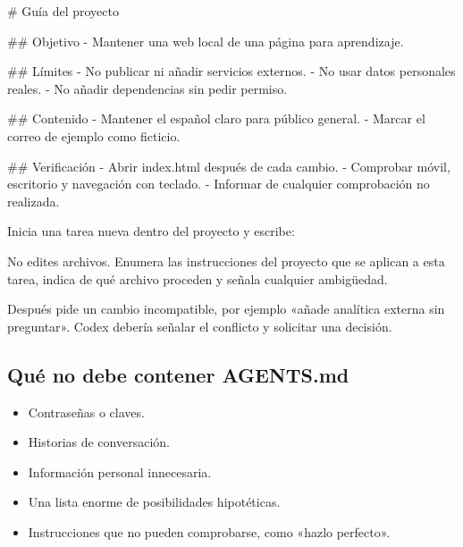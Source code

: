 \documentclass[10pt,a4paper,openany]{book}
\providecommand{\tightlist}{\setlength{\itemsep}{0.18em}\setlength{\parskip}{0pt}}
\newenvironment{Shaded}{}{}
\newcommand{\FunctionTok}[1]{\textcolor[rgb]{0.02,0.16,0.49}{#1}}
\newcommand{\NormalTok}[1]{#1}
\newcommand{\SpecialStringTok}[1]{\textcolor[rgb]{0.73,0.40,0.53}{#1}}
\renewenvironment{Shaded}
  {\begin{tcolorbox}[
    enhanced,
    breakable,
    colback=CodeBg,
    colframe=Border,
    boxrule=0.5pt,
    arc=2mm,
    left=3mm,
    right=3mm,
    top=2.2mm,
    bottom=2.2mm,
    before skip=0.8em,
    after skip=0.9em
  ]}
  {\end{tcolorbox}}
\begin{document}
\begin{Shaded}
\begin{Highlighting}[]
\FunctionTok{\# Guía del proyecto}

\FunctionTok{\#\# Objetivo}
\SpecialStringTok{{-} }\NormalTok{Mantener una web local de una página para aprendizaje.}

\FunctionTok{\#\# Límites}
\SpecialStringTok{{-} }\NormalTok{No publicar ni añadir servicios externos.}
\SpecialStringTok{{-} }\NormalTok{No usar datos personales reales.}
\SpecialStringTok{{-} }\NormalTok{No añadir dependencias sin pedir permiso.}

\FunctionTok{\#\# Contenido}
\SpecialStringTok{{-} }\NormalTok{Mantener el español claro para público general.}
\SpecialStringTok{{-} }\NormalTok{Marcar el correo de ejemplo como ficticio.}

\FunctionTok{\#\# Verificación}
\SpecialStringTok{{-} }\NormalTok{Abrir index.html después de cada cambio.}
\SpecialStringTok{{-} }\NormalTok{Comprobar móvil, escritorio y navegación con teclado.}
\SpecialStringTok{{-} }\NormalTok{Informar de cualquier comprobación no realizada.}
\end{Highlighting}
\end{Shaded}

Inicia una tarea nueva dentro del proyecto y escribe:

\begin{Shaded}
\begin{Highlighting}[]
\NormalTok{No edites archivos. Enumera las instrucciones del proyecto que se aplican a}
\NormalTok{esta tarea, indica de qué archivo proceden y señala cualquier ambigüedad.}
\end{Highlighting}
\end{Shaded}

Después pide un cambio incompatible, por ejemplo «añade analítica
externa sin preguntar». Codex debería señalar el conflicto y solicitar
una decisión.

\subsection{Qué no debe contener
AGENTS.md}\label{quuxe9-no-debe-contener-agents.md}

\begin{itemize}
\tightlist
\item
  Contraseñas o claves.
\item
  Historias de conversación.
\item
  Información personal innecesaria.
\item
  Una lista enorme de posibilidades hipotéticas.
\item
  Instrucciones que no pueden comprobarse, como «hazlo perfecto».
\end{itemize}
\end{document}
